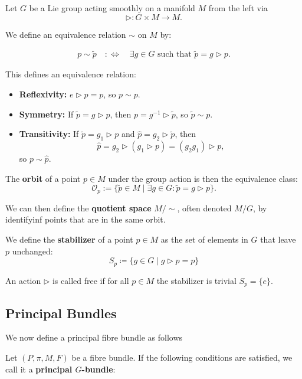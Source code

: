 Let \( G \) be a Lie group acting smoothly on a manifold \( M \) from the left via
\[
\triangleright : G \times M \longrightarrow M.
\]

We define an equivalence relation \( \sim \) on \( M \) by:

\begin{align*}
p \sim \tilde{p} \quad :\Longleftrightarrow \quad \exists g \in G \text{ such that } \tilde{p} = g \triangleright p.
\end{align*}

This defines an equivalence relation:
\begin{itemize}
  \item \textbf{Reflexivity:} \( e \triangleright p = p \), so \( p \sim p \).
  \item \textbf{Symmetry:} If \( \tilde{p} = g \triangleright p \), then \( p = g^{-1} \triangleright \tilde{p} \), so \( \tilde{p} \sim p \).
  \item \textbf{Transitivity:} If \( \tilde{p} = g_1 \triangleright p \) and \( \hat{p} = g_2 \triangleright \tilde{p} \), then
  \[
  \hat{p} = g_2 \triangleright (g_1 \triangleright p) = (g_2 g_1) \triangleright p,
  \]
  so \( p \sim \hat{p} \).
\end{itemize}

The \textbf{orbit} of a point \( p \in M \) under the group action is then the equivalence class:
\[
\mathcal{O}_p := \{ \tilde{p} \in M \mid \exists g \in G : \tilde{p} = g \triangleright p \}.
\]

We can then define the \textbf{quotient space} \( M/\!\sim \), often denoted \( M/G \), by identifyinf points that are in the same orbit.

We define the \textbf{stabilizer} of a point \( p \in M \) as the set of elements in \( G \) that leave \( p \) unchanged:
\[ S_p \coloneqq \{g \in G \mid g \triangleright p = p \} \]

An action $\triangleright$ is called free if for all \( p \in M \) the stabilizer is trivial \( S_p = \{e\} \).





\subsection{Principal Bundles}

We now define a principal fibre bundle as follows \cite{FredericSchullerPrincipalfibrebundlesLec19FredericSchuller2015} 

Let \( (P, \pi, M, F) \) be a fibre bundle. If the following conditions are satisfied, we call it a \textbf{principal \( G \)-bundle}:

